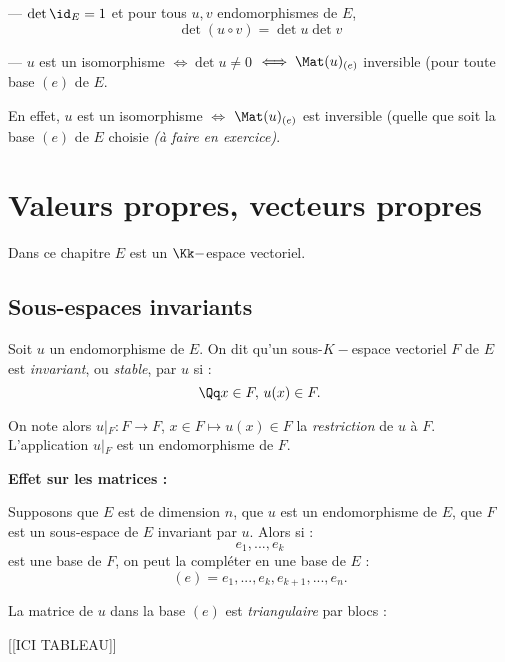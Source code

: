 \documentclass[class=report,crop=false]{standalone}
\newcommand{\exoo}{\emph{(à faire en exercice)}}
\newcommand{\Res}[1]{{\left | {}_{#1} \right.}}
\begin{document}
\begin{remarque*}[(s) importantes]

--- $\det \id_E = 1$ et pour tous $ u,v$  endomorphismes de $E$, 
\[\det (u\circ v) = \det u \det v\]

--- $u$ est un isomorphisme $\iff \det u \neq 0$ $\iff \Mat(u)_{(e)}$ inversible (pour toute base $(e)$ de $E$. 


En effet, $u$ est un isomorphisme $\iff$ $\Mat(u)_{(e)}$ est inversible (quelle que soit la base $(e)$ de $E$ choisie \exoo.
\end{remarque*}

\chapter{Valeurs propres, vecteurs propres}
Dans ce chapitre $E$ est un $\Kk-$espace vectoriel.
 
 
\section{Sous-espaces invariants}


\begin{definition}
Soit $u$ un endomorphisme de $E$. On dit qu'un sous-$K-$espace vectoriel $F$ de $E$ est {\it invariant}, ou {\it stable}, par $u$ si :
\[\Qq x \in F,\, u(x) \in F .\]

On note alors $u\Res{F} : F \to F$, $x \in F \mapsto u(x) \in F$ la {\it restriction} de $u$ à $F$. L'application $u\Res{F}$ est un endomorphisme de $F$.

\end{definition}

{\bf Effet sur les matrices :}

Supposons que $E$ est de dimension $n$, que $u$ est un endomorphisme de $E$, que $F$ est un sous-espace de $E$ invariant par $u$. Alors si :
\[e_1,...,e_k\]
est une base de $F$, on peut la compléter en une base de $E$ :
\[(e) = e_1,...,e_k,e_{k+1},...,e_n.\]

La matrice de $u$ dans la base $(e)$ est {\it triangulaire} par blocs :

[[ICI TABLEAU]]

\end{document}
